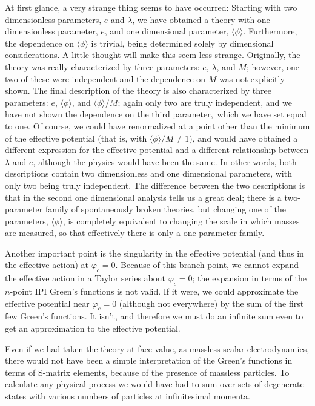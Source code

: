 \documentclass[12pt,epsf]{report}
\def\pc{\varphi_c}
\def\vev{\langle \phi \rangle}
\begin{document}
At first glance, a very strange thing seems to have occurred: Starting
with two dimensionless parameters, $e$ and $\lambda$, we have obtained
a theory with one dimensionless parameter, $e$, and one dimensional
parameter, $\vev$.  Furthermore, the dependence on $\vev$ is trivial,
being determined solely by dimensional considerations.  A little
thought will make this seem less strange.  Originally, the theory was
really characterized by three parameters: $e$, $\lambda$, and $M$;
however, one two of these were independent and the dependence on $M$
was not explicitly shown.  The final description of the theory is also
characterized by three parameters: $e$, $\vev$, and $\vev/M$; again
only two are truly independent, and we have not shown the dependence
on the third parameter,\ which we have set equal to one.  Of course,
we could have renormalized at a point other than the minimum of the
effective potential (that is, with $\vev/M \ne 1$), and would have
obtained a different expression for the effective potential and a
different relationship between $\lambda$ and $e$, although the physics
would have been the same.  In other words, both descriptions contain
two dimensionless and one dimensional parameters, with only two being
truly independent.  The difference between the two descriptions is
that in the second one dimensional analysis tells us a great deal;
there is a two-parameter family of spontaneously broken theories, but
changing one of the parameters, $\vev$, is completely equivalent to
changing the scale in which masses are measured, so that effectively
there is only a one-parameter family.

Another important point is the singularity in the effective potential 
(and thus in the effective action) at $\pc = 0$.  Because of this
branch point, we cannot expand the effective action in a Taylor 
series about $\pc=0$; the expansion in terms of the $n$-point IPI
Green's functions is not valid.  If it were, we could approximate the 
effective potential near $\pc=0$ (although not everywhere) by the 
sum of the first few Green's functions.  It isn't, and therefore we 
must do an infinite sum even to get an approximation to the effective
potential.

Even if we had taken the theory at face value, as massless scalar 
electrodynamics, there would not have been a simple interpretation of the 
Green's functions in terms of S-matrix elements, because of the 
presence of massless particles.  To calculate any physical process 
we would have had to sum over sets of degenerate states with various
numbers of particles at infinitesimal momenta.
\end{document}
